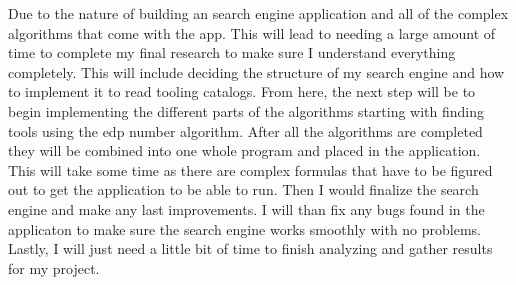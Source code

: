 Due to the nature of building an search engine application and all of the complex algorithms that come with the app. This will lead to needing a large amount of time to complete my final research to make sure I understand everything completely. This will include deciding the structure of my search engine and how to implement it to read tooling catalogs. From here, the next step will be to begin implementing the different parts of the algorithms starting with finding tools using the edp number algorithm. After all the algorithms are completed they will be combined into one whole program and placed in the application. This will take some time as there are complex formulas that have to be figured out to get the application to be able to run. Then I would finalize the search engine and make any last improvements. I will than fix any bugs found in the applicaton to make sure the search engine works smoothly with no problems.  Lastly, I will just need a little bit of time to finish analyzing and gather results for my project.
